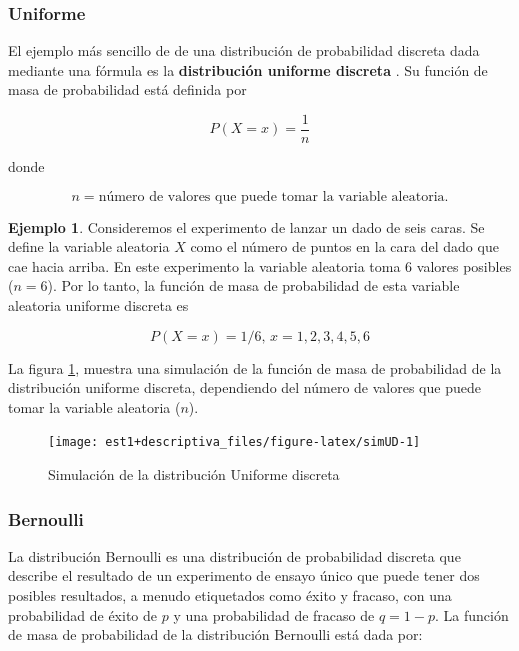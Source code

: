 \documentclass[
  11pt,
]{book}
\theoremstyle{definition}
\theoremstyle{definition}
\newtheorem{example}{Ejemplo}[chapter]
\theoremstyle{definition}
\theoremstyle{definition}
\theoremstyle{remark}
\begin{document}
\subsubsection{Uniforme}\label{uniforme}

El ejemplo más sencillo de de una distribución de probabilidad discreta dada mediante una fórmula es la \textbf{distribución uniforme discreta} \citep[página 191]{anderson}. Su función de masa de probabilidad está definida por

\begin{equation}
P(X=x) = \dfrac{1}{n}
\label{eq:uniformediscreta}
\end{equation}

donde

\[n = \text{número de valores que puede tomar la variable aleatoria.}\]

\begin{example}
Consideremos el experimento de lanzar un dado de seis caras. Se define la variable aleatoria \(X\) como el número de puntos en la cara del dado que cae hacia arriba. En este experimento la variable aleatoria toma 6 valores posibles (\(n = 6\)). Por lo tanto, la función de masa de probabilidad de esta variable aleatoria uniforme discreta es

\[P(X = x)=1/6 \text{, } x = 1,2,3,4,5,6\]
\end{example}

La figura \ref{fig:simUD}, muestra una simulación de la función de masa de probabilidad de la distribución uniforme discreta, dependiendo del número de valores que puede tomar la variable aleatoria (\(n\)).

\begin{figure}

{\centering \texttt{[image: est1+descriptiva\_files/figure-latex/simUD-1]} 

}

\caption{Simulación de la distribución Uniforme discreta}\label{fig:simUD}
\end{figure}

\subsubsection{Bernoulli}\label{bernoulli}

La distribución Bernoulli es una distribución de probabilidad discreta que describe el resultado de un experimento de ensayo único que puede tener dos posibles resultados, a menudo etiquetados como éxito y fracaso, con una probabilidad de éxito de \(p\) y una probabilidad de fracaso de \(q = 1 - p\). La función de masa de probabilidad de la distribución Bernoulli está dada por:
\end{document}
